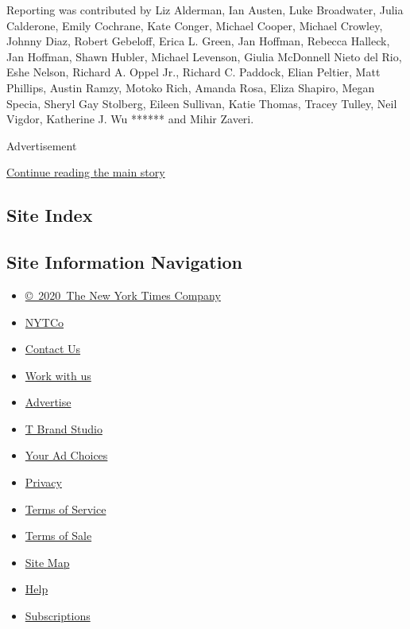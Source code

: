 Reporting was contributed by Liz Alderman, Ian Austen, Luke Broadwater,
Julia Calderone, Emily Cochrane, Kate Conger, Michael Cooper, Michael
Crowley, Johnny Diaz, Robert Gebeloff, Erica L. Green, Jan Hoffman,
Rebecca Halleck, Jan Hoffman, Shawn Hubler, Michael Levenson, Giulia
McDonnell Nieto del Rio, Eshe Nelson, Richard A. Oppel Jr., Richard C.
Paddock, Elian Peltier, Matt Phillips, Austin Ramzy, Motoko Rich, Amanda
Rosa, Eliza Shapiro, Megan Specia, Sheryl Gay Stolberg, Eileen Sullivan,
Katie Thomas, Tracey Tulley, Neil Vigdor, Katherine J. Wu ****** and
Mihir Zaveri.

Advertisement

\protect\hyperlink{after-bottom}{Continue reading the main story}

\hypertarget{site-index}{%
\subsection{Site Index}\label{site-index}}

\hypertarget{site-information-navigation}{%
\subsection{Site Information
Navigation}\label{site-information-navigation}}

\begin{itemize}
\tightlist
\item
  \href{https://help.nytimes.com/hc/en-us/articles/115014792127-Copyright-notice}{©~2020~The
  New York Times Company}
\end{itemize}

\begin{itemize}
\tightlist
\item
  \href{https://www.nytco.com/}{NYTCo}
\item
  \href{https://help.nytimes.com/hc/en-us/articles/115015385887-Contact-Us}{Contact
  Us}
\item
  \href{https://www.nytco.com/careers/}{Work with us}
\item
  \href{https://nytmediakit.com/}{Advertise}
\item
  \href{http://www.tbrandstudio.com/}{T Brand Studio}
\item
  \href{https://www.nytimes.com/privacy/cookie-policy\#how-do-i-manage-trackers}{Your
  Ad Choices}
\item
  \href{https://www.nytimes.com/privacy}{Privacy}
\item
  \href{https://help.nytimes.com/hc/en-us/articles/115014893428-Terms-of-service}{Terms
  of Service}
\item
  \href{https://help.nytimes.com/hc/en-us/articles/115014893968-Terms-of-sale}{Terms
  of Sale}
\item
  \href{https://spiderbites.nytimes.com}{Site Map}
\item
  \href{https://help.nytimes.com/hc/en-us}{Help}
\item
  \href{https://www.nytimes.com/subscription?campaignId=37WXW}{Subscriptions}
\end{itemize}
